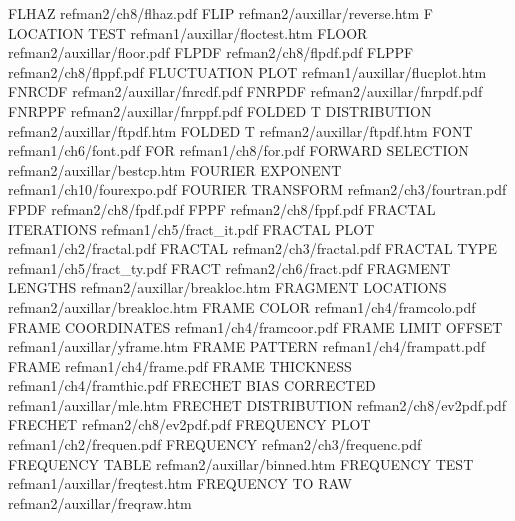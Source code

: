 FLHAZ                                   refman2/ch8/flhaz.pdf
FLIP                                    refman2/auxillar/reverse.htm
F LOCATION TEST                         refman1/auxillar/floctest.htm
FLOOR                                   refman2/auxillar/floor.pdf
FLPDF                                   refman2/ch8/flpdf.pdf
FLPPF                                   refman2/ch8/flppf.pdf
FLUCTUATION PLOT                        refman1/auxillar/flucplot.htm
FNRCDF                                  refman2/auxillar/fnrcdf.pdf
FNRPDF                                  refman2/auxillar/fnrpdf.pdf
FNRPPF                                  refman2/auxillar/fnrppf.pdf
FOLDED T DISTRIBUTION                   refman2/auxillar/ftpdf.htm
FOLDED T                                refman2/auxillar/ftpdf.htm
FONT                                    refman1/ch6/font.pdf
FOR                                     refman1/ch8/for.pdf
FORWARD SELECTION                       refman2/auxillar/bestcp.htm
FOURIER EXPONENT                        refman1/ch10/fourexpo.pdf
FOURIER TRANSFORM                       refman2/ch3/fourtran.pdf
FPDF                                    refman2/ch8/fpdf.pdf
FPPF                                    refman2/ch8/fppf.pdf
FRACTAL ITERATIONS                      refman1/ch5/fract_it.pdf
FRACTAL PLOT                            refman1/ch2/fractal.pdf
FRACTAL                                 refman2/ch3/fractal.pdf
FRACTAL TYPE                            refman1/ch5/fract_ty.pdf
FRACT                                   refman2/ch6/fract.pdf
FRAGMENT LENGTHS                        refman2/auxillar/breakloc.htm
FRAGMENT LOCATIONS                      refman2/auxillar/breakloc.htm
FRAME COLOR                             refman1/ch4/framcolo.pdf
FRAME COORDINATES                       refman1/ch4/framcoor.pdf
FRAME LIMIT OFFSET                      refman1/auxillar/yframe.htm
FRAME PATTERN                           refman1/ch4/frampatt.pdf
FRAME                                   refman1/ch4/frame.pdf
FRAME THICKNESS                         refman1/ch4/framthic.pdf
FRECHET BIAS CORRECTED                  refman1/auxillar/mle.htm
FRECHET DISTRIBUTION                    refman2/ch8/ev2pdf.pdf
FRECHET                                 refman2/ch8/ev2pdf.pdf
FREQUENCY PLOT                          refman1/ch2/frequen.pdf
FREQUENCY                               refman2/ch3/frequenc.pdf
FREQUENCY TABLE                         refman2/auxillar/binned.htm
FREQUENCY TEST                          refman1/auxillar/freqtest.htm
FREQUENCY TO RAW                        refman2/auxillar/freqraw.htm
